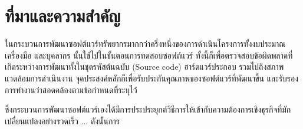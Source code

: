 \section{ที่มาและความสำคัญ} 

ในกระบวนการพัฒนาซอฟต์แวร์ทรัพยากรมากกว่าครึ่งหนึ่งของการดำเนินโครงการทั้งงบประมาณ เครื่องมือ และบุคลากร นั้นใช้ไปในขั้นตอนการทดสอบซอฟต์แวร์ %
ทั้งนี้ก็เพื่อตรวจสอบข้อผิดพลาดที่เกิดระหว่างการพัฒนาทั้งในชุดรหัสต้นฉบับ (Source code) ฮาร์ดแวร์ประกอบ รวมไปถึงสภาพแวดล้อมการดำเนินงาน 
จุดประสงค์หลักก็เพื่อรับประกันคุณภาพของซอฟต์แวร์ที่พัฒนาขึ้น และรับรองการทำงานว่าสอดคล้องตามข้อกำหนดที่ระบุไว้

ซึ่งกระบวนการพัฒนาซอฟต์แวร์เองได้มีการประประยุกต์วิธีการให้เข้ากับความต้องการเชิงธุรกิจที่มักเปลี่ยนแปลงอย่างรวดเร็ว ... ดังนั้นการ






